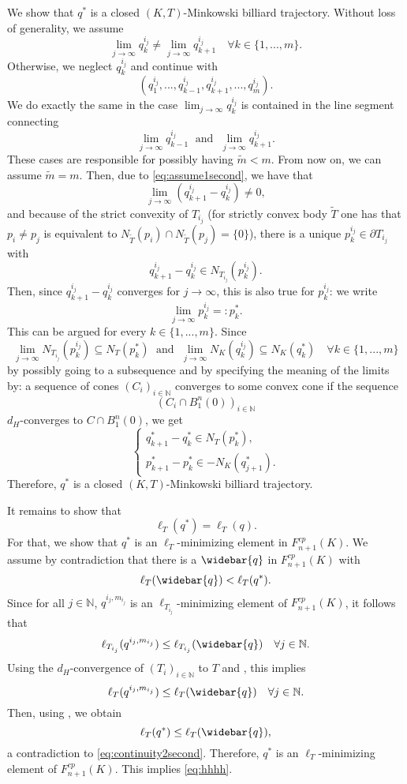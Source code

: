 \documentclass[12pt]{amsart}
\theoremstyle{plain}
\theoremstyle{remark}
\theoremstyle{definition}
\newcommand{\N}{\mathbb{N}}
\def\beq{\begin{equation}}\def\eeq{\end{equation}}
\def\beqq{\begin{equation*}}\def\eeqq{\end{equation*}}
\begin{document}
We show that $q^*$ is a closed $(K,T)$-Minkowski billiard trajectory. Without loss of generality, we assume
\beq \lim_{j\rightarrow\infty} q_k^{i_j} \neq \lim_{j\rightarrow\infty} q_{k+1}^{i_j} \quad \forall k\in\{1,...,m\}.\label{eq:assume1second}\eeq
Otherwise, we neglect $q_k^{i_j}$ and continue with
\beqq (q_1^{i_j}, ...,q_{k-1}^{i_j},q_{k+1}^{i_j},...,q_m^{i_j}).\eeqq
We do exactly the same in the case $\lim_{j\rightarrow\infty}q_k^{i_j}$ is contained in the line segment connecting
\beqq \lim_{j\rightarrow\infty} q_{k-1}^{i_j}\; \text{ and }\; \lim_{j\rightarrow\infty} q_{k+1}^{i_j}.\eeqq 
These cases are responsible for possibly having $\widetilde{m}<m$. From now on, we can assume $\widetilde{m}=m$. Then, due to \eqref{eq:assume1second}, we have that
\beqq \lim_{j\rightarrow\infty} \left( q_{k+1}^{i_j}-q_k^{i_j}\right)\neq 0, \eeqq
and because of the strict convexity of $T_{i_j}$ (for strictly convex body $\widetilde{T}$ one has that $p_i\neq p_j$ is equivalent to $N_{\widetilde{T}}(p_i)\cap N_{\widetilde{T}}(p_j)=\{0\}$), there is a unique $p_k^{i_j}\in\partial T_{i_j}$ with
\beqq q_{k+1}^{i_j}-q_k^{i_j} \in N_{T_{i_j}}(p_k^{i_j}).\eeqq
Then, since $q_{k+1}^{i_j}-q_k^{i_j}$ converges for $j\rightarrow \infty$, this is also true for $p_k^{i_j}$: we write
\beqq \lim_{j\rightarrow\infty} p_k^{i_j}=:p_k^*.\eeqq
This can be argued for every $k\in\{1,...,m\}$. Since
\beqq \lim_{j\rightarrow\infty}N_{T_{i_j}}(p_k^{i_j})\subseteq N_T(p_k^*) \; \text{ and } \; \lim_{j\rightarrow\infty} N_K(q_k^{i_j})\subseteq N_K(q_k^*)\quad \forall k\in\{1,...,m\}\eeqq
by possibly going to a subsequence and by specifying the meaning of the limits by: a sequence of cones $(C_i)_{i\in\N}$ converges to some convex cone if the sequence
\beqq (C_i \cap B_1^n(0))_{i\in\N}\eeqq
$d_H$-converges to $C\cap B_1^n(0)$, we get
\beqq \begin{cases} q_{k+1}^*-q_k^ *\in N_T(p_k^*), \\ p_{k+1}^*-p_k^* \in - N_K(q_{j+1}^*).\end{cases}\eeqq
Therefore, $q^*$ is a closed $(K,T)$-Minkowski billiard trajectory.

It remains to show that
\beq \ell_T(q^*)=\ell_T(q).\label{eq:hhhh}\eeq
For that, we show that $q^*$ is an $\ell_T$-minimizing element in $F_{n+1}^{cp}(K)$. We assume by contradiction that there is a $\widebar{q}$ in $F_{n+1}^{cp}(K)$ with
\beq \ell_T(\widebar{q})<\ell_T(q^*).\label{eq:continuity2second}\eeq
Since for all $j\in\N$, $q^{i_j,m_{i_j}}$ is an $\ell_{T_{i_j}}$-minimizing element of $F_{n+1}^{cp}(K)$, it follows that
\beqq \ell_{T_{i_j}}(q^{i_j,m_{i_j}})\leq \ell_{T_{i_j}}(\widebar{q}) \quad \forall j\in\N.\eeqq
Using the $d_H$-convergence of $(T_i)_{i\in\N}$ to $T$ and \cite[Proposition 3.11(vi)]{KruppRudolf2022}, this implies
\beqq \ell_T(q^{i_j,m_{i_j}})\leq \ell_T(\widebar{q})\quad \forall j\in\N.\eeqq
Then, using \cite[Proposition 3.11(v)]{KruppRudolf2022}, we obtain
\beqq \ell_T(q^*)\leq \ell_T(\widebar{q}),\eeqq
a contradiction to \eqref{eq:continuity2second}. Therefore, $q^*$ is an $\ell_T$-minimizing element of $F_{n+1}^{cp}(K)$. This implies \eqref{eq:hhhh}.
\epf
\end{document}
